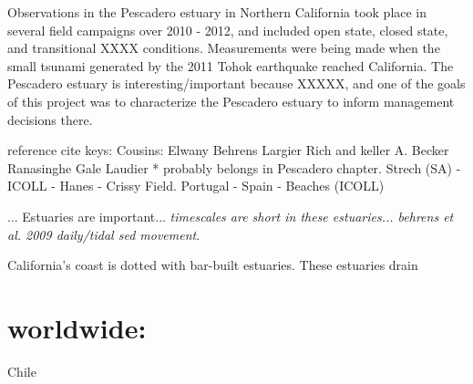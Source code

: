 Observations in the Pescadero estuary in Northern California took place in several field campaigns over 2010 - 2012, and included open state, closed state, and transitional XXXX conditions. Measurements were being made when the small tsunami generated by the 2011 Tohok earthquake reached California. The Pescadero estuary is interesting/important because XXXXX, and one of the goals of this project was to characterize the Pescadero estuary to inform management decisions there. 



























reference cite keys:
Cousins: \cite{cousins_effects_2010,cousins_hydrodynamics_2011}
Elwany \cite{elwany_opening_1998}
Behrens \cite{behrens_characterization_2009,behrens_episodic_2013}
Largier \cite{largier_structure_1986,slinger_evolution_1990,largier_circulation_1991,largier_dynamics_1991,largier_stratified_1992,largier_tidal_1992,largier_seasonally_1997}
Rich and keller \cite{rich_hydrologic_2013}
A. Becker \cite{becker_artificial_2009}
Ranasinghe \cite{ranasinghe_flushing_1998,ranasinghe_circulation_1999,ranasinghe_morphodynamic_1999,ranasinghe_seasonal_2003}
Gale \cite{gale_vertical_2006,gale_processes_2007}
Laudier \cite{laudier_measured_2011} * probably belongs in Pescadero chapter.
Strech (SA) - \cite{stretch_breaching_2006,parkinson_breaching_2007}
ICOLL - \cite{haines_morphometric_2006,baldock_morphodynamic_2008,davidson_simple_2009}
Hanes - Crissy Field. \cite{hanes_waves_2011}
Portugal - \cite{fortunato_morphological_2014}
Spain - \cite{moreno_morphodynamics_2010}
\cite{uncles_infragravity_2014}
Beaches (ICOLL)  \cite{weir_beach_2006}

... Estuaries are important... 
\emph{timescales are short in these estuaries... behrens et al. 2009 daily/tidal sed movement}.



California's coast is dotted with bar-built estuaries.  These estuaries drain 


\section{worldwide:}
Chile \parencite{dussaillant_water_2009}


